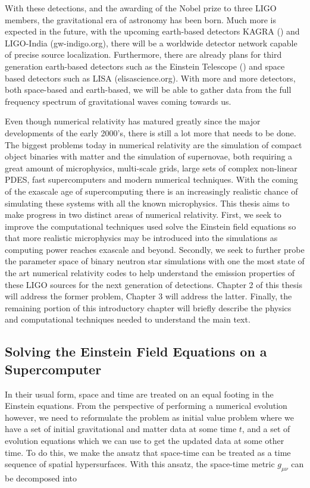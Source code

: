 With these detections, and the awarding of the Nobel prize to three LIGO members, the gravitational era of astronomy has been born. Much more is expected in the future, with the upcoming earth-based detectors KAGRA (\cite{somiya2012detector}) and LIGO-India (gw-indigo.org), there will be a worldwide detector network capable of precise source localization. Furthermore, there are already plans for third generation earth-based detectors such as the Einstein Telescope (\cite{einsteintelescope}) and space based detectors such as LISA (elisascience.org). With more and more detectors, both space-based and earth-based, we will be able to gather data from the full frequency spectrum of gravitational waves coming towards us.

Even though numerical relativity has matured greatly since the major developments of the early 2000's, there is still a lot more that needs to be done. The biggest problems today in numerical relativity are the simulation of compact object binaries with matter and the simulation of supernovae, both requiring a great amount of microphysics, multi-scale grids, large sets of complex non-linear PDES, fast supercomputers and modern numerical techniques. With the coming of the exascale age of supercomputing there is an increasingly realistic chance of simulating these systems with all the known microphysics. This thesis aims to make progress in two distinct areas of numerical relativity. First, we seek to improve the computational techniques used solve the Einstein field equations so that more realistic microphysics may be introduced into the simulations as computing power reaches exascale and beyond. Secondly, we seek to further probe the parameter space of binary neutron star simulations with one the most state of the art numerical relativity codes to help understand the emission properties of these LIGO sources for the next generation of detections. Chapter 2 of this thesis will address the former problem, Chapter 3 will address the latter. Finally, the remaining portion of this introductory chapter will briefly describe the physics and computational techniques needed to understand the main text. 

\subsection{Solving the Einstein Field Equations on a Supercomputer}

In their usual form, space and time are treated on an equal footing in the Einstein equations. From the perspective of performing a numerical evolution however, we need to reformulate the problem as initial value problem where we have a set of initial gravitational and matter data at some time $t$, and a set of evolution equations which we can use to get the updated data at some other time. To do this, we make the ansatz that space-time can be treated as a time sequence of spatial hypersurfaces. With this ansatz, the space-time metric $g_{\mu\nu}$ can be decomposed into

